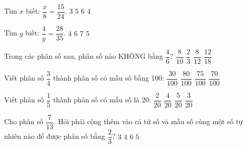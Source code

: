 \begin{ex} %
Tìm $x$ biết: $\dfrac{x}{8} = \dfrac{15}{24}$.
\choice
{$3$}
{\True $5$}
{$6$}
{$4$}
\end{ex}

\begin{ex} %
Tìm $y$ biết: $\dfrac{4}{y} = \dfrac{28}{35}$.
\choice
{$4$}
{$6$}
{$7$}
{\True $5$}
\end{ex}

\begin{ex} %
Trong các phân số sau, phân số nào KHÔNG bằng $\dfrac{4}{6}$?
\choice
{\True $\dfrac{8}{10}$}
{$\dfrac{2}{3}$}
{$\dfrac{8}{12}$}
{$\dfrac{12}{18}$}
\end{ex}

\begin{ex} %
Viết phân số $\dfrac{3}{4}$ thành phân số có mẫu số bằng 100:
\choice
{$\dfrac{30}{100}$}
{$\dfrac{80}{100}$}
{\True $\dfrac{75}{100}$}
{$\dfrac{70}{100}$}
\end{ex}

\begin{ex} %
Viết phân số $\dfrac{1}{5}$ thành phân số có mẫu số là 20:
\choice
{$\dfrac{2}{20}$}
{\True $\dfrac{4}{20}$}
{$\dfrac{5}{20}$}
{$\dfrac{3}{20}$}
\end{ex}

\begin{ex} %
Cho phân số $\dfrac{7}{13}$. Hỏi phải cộng thêm vào cả tử số và mẫu số cùng một số tự nhiên nào để được phân số bằng $\dfrac{2}{3}$?
\choice
{$3$}
{$4$}
{$6$}
{\True $5$}
\end{ex}

